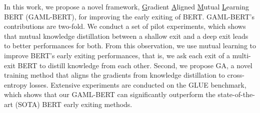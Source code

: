 In this work, we propose a novel framework, \underline{G}radient \underline{A}ligned \underline{M}utual \underline{L}earning BERT (GAML-BERT), for improving the early exiting of BERT. GAML-BERT's contributions are two-fold. We conduct a set of pilot experiments, which shows that mutual knowledge distillation between a shallow exit and a deep exit leads to better performances for both. From this observation, we use mutual learning to improve BERT's early exiting performances, that is, we ask each exit of a multi-exit BERT to distill knowledge from each other. Second, we propose GA, a novel training method that aligns the gradients from knowledge distillation to cross-entropy losses. Extensive experiments are conducted on the GLUE benchmark, which shows that our GAML-BERT can significantly outperform the state-of-the-art (SOTA) BERT early exiting methods.
